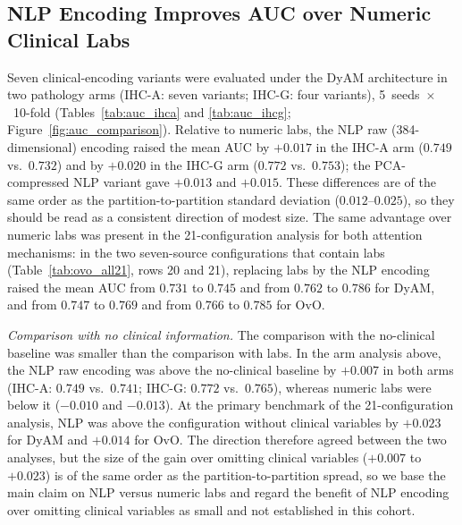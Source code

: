 



\subsection{NLP Encoding Improves AUC over Numeric Clinical Labs}
\label{sec:nlp_auc}

Seven clinical-encoding variants were evaluated under the DyAM architecture in two pathology
arms (IHC-A: seven variants; IHC-G: four variants), 5~seeds~$\times$~10-fold
(Tables~\ref{tab:auc_ihca} and \ref{tab:auc_ihcg}; Figure~\ref{fig:auc_comparison}).
Relative to numeric labs, the NLP raw (384-dimensional) encoding raised the mean AUC by
$+0.017$ in the IHC-A arm ($0.749$ vs.\ $0.732$) and by $+0.020$ in the IHC-G arm
($0.772$ vs.\ $0.753$); the PCA-compressed NLP variant gave $+0.013$ and $+0.015$.
These differences are of the same order as the partition-to-partition standard deviation
($0.012$--$0.025$), so they should be read as a consistent direction of modest size.
The same advantage over numeric labs was present in the 21-configuration analysis for both
attention mechanisms: in the two seven-source configurations that contain labs
(Table~\ref{tab:ovo_all21}, rows 20 and 21), replacing labs by the NLP encoding raised the
mean AUC from $0.731$ to $0.745$ and from $0.762$ to $0.786$ for DyAM, and from $0.747$ to
$0.769$ and from $0.766$ to $0.785$ for OvO.

\emph{Comparison with no clinical information.}
The comparison with the no-clinical baseline was smaller than the comparison with labs.
In the arm analysis above, the NLP raw encoding was above the no-clinical baseline by $+0.007$ in both arms
(IHC-A: $0.749$ vs.\ $0.741$; IHC-G: $0.772$ vs.\ $0.765$), whereas numeric labs were below it
($-0.010$ and $-0.013$).
At the primary benchmark of the 21-configuration analysis, NLP was above the configuration without clinical
variables by $+0.023$ for DyAM and $+0.014$ for OvO.
The direction therefore agreed between the two analyses, but the size of the gain over omitting clinical
variables ($+0.007$ to $+0.023$) is of the same order as the partition-to-partition spread, so we base the
main claim on NLP versus numeric labs and regard the benefit of NLP encoding over omitting clinical variables
as small and not established in this cohort.

